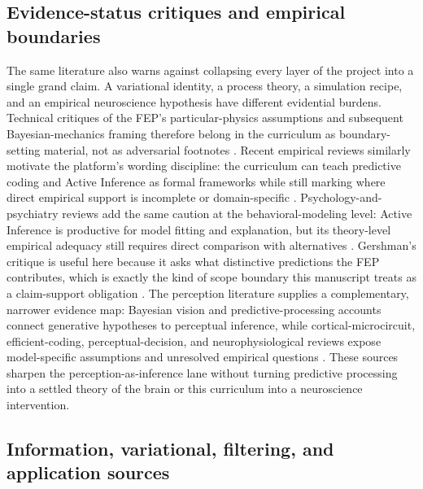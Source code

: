 \documentclass[
  english,
]{article}
\begin{document}
\subsection{Evidence-status critiques and empirical
boundaries}\label{evidence-status-critiques-and-empirical-boundaries}

The same literature also warns against collapsing every layer of the
project into a single grand claim. A variational identity, a process
theory, a simulation recipe, and an empirical neuroscience hypothesis
have different evidential burdens. Technical critiques of the FEP's
particular-physics assumptions and subsequent Bayesian-mechanics framing
therefore belong in the curriculum as boundary-setting material, not as
adversarial footnotes
\citep{aguilera2022particular, aguilera2023confederation}. Recent
empirical reviews similarly motivate the platform's wording discipline:
the curriculum can teach predictive coding and Active Inference as
formal frameworks while still marking where direct empirical support is
incomplete or domain-specific \citep{hodson2024empirical}.
Psychology-and-psychiatry reviews add the same caution at the
behavioral-modeling level: Active Inference is productive for model
fitting and explanation, but its theory-level empirical adequacy still
requires direct comparison with alternatives
\citep{badcock2024psychology_psychiatry}. Gershman's critique is useful
here because it asks what distinctive predictions the FEP contributes,
which is exactly the kind of scope boundary this manuscript treats as a
claim-support obligation \citep{gershman2019free}. The perception
literature supplies a complementary, narrower evidence map: Bayesian
vision and predictive-processing accounts connect generative hypotheses
to perceptual inference, while cortical-microcircuit, efficient-coding,
perceptual-decision, and neurophysiological reviews expose
model-specific assumptions and unresolved empirical questions
\citep{yuille2006vision_bayesian, clark2013predictive_brain, hohwy2013predictive_mind, kersten2004object_perception, bastos2012canonical_microcircuits, spratling2017predictive_algorithms, summerfield2014perceptual_decision, wei2015efficient_bayesian_perception, millidge2021predictive_coding_review, smith2020predictive_neurophysiology, seth2020predictive_consciousness}.
These sources sharpen the perception-as-inference lane without turning
predictive processing into a settled theory of the brain or this
curriculum into a neuroscience intervention.

\subsection{Information, variational, filtering, and application
sources}\label{information-variational-filtering-and-application-sources}
\end{document}
